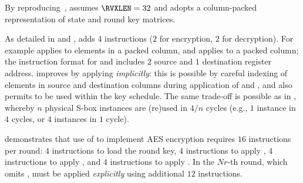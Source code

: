 
By reproducing~\cite[Section 4.3]{TilGro:06},
assumes 
$\RVXLEN = 32$
and adopts a 
column-packed 
representation of state and round key matrices.

As detailed in
and
,
adds
$ 4$
instructions ($2$ for encryption, $2$ for decryption).
For example
applies 
to elements in   a packed column,
and
applies 
to               a packed column;
the instruction format for
and
includes $2$ source and $1$ destination register address.
 improves  by applying  
{\em implicitly}:
this is possible by careful indexing of elements in source and destination
columns during application of  and ,
and also permits
to be used within the key schedule.
The same trade-off is possible as in , whereby
$n$ physical S-box instances are (re)used in $4/n$ cycles
(e.g., $1$ instance in $4$ cycles, or $4$ instances in $1$ cycle).

demonstrates that use of  to implement AES encryption requires
$16$ instructions per round:
$ 4$            
     instructions to load the round key,
$ 4$            
     instructions to apply ,
$ 4$   
     instructions to apply ,
     and
$ 4$   
     instructions to apply .
In the $Nr$-th round, which omits ,
 must be applied
{\em explicitly}
using additional 
$12$ instructions.

